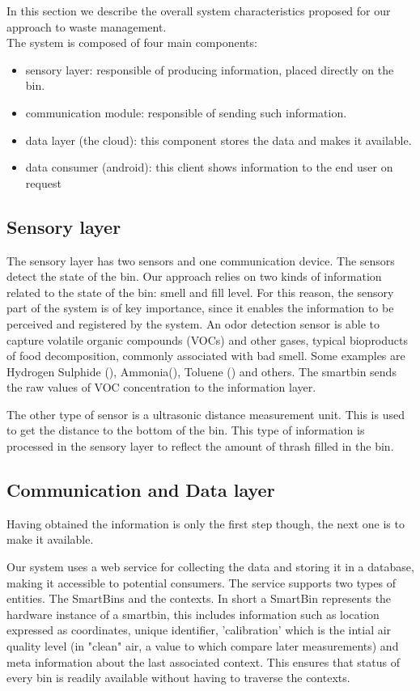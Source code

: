 
In this section we describe the overall system characteristics proposed for our approach to waste management.\\

The system is composed of four main components:
\begin{itemize}
\item sensory layer: responsible of producing information, placed directly on the bin.
\item communication module: responsible of sending such information.
\item data layer (the cloud): this component stores the data and makes it available.
\item data consumer (android):  this client shows information to the end user on request
\end{itemize}

\subsection{Sensory layer}
The sensory layer has two sensors and one communication device. The sensors detect the state of the bin.
Our approach relies on two kinds of information related to the state of the bin: smell and fill level.
For this reason, the sensory part of the system is of key importance, since it enables the information to be perceived and registered by the system.
An odor detection sensor is able to capture volatile organic compounds (VOCs) and other gases, typical bioproducts of food decomposition, commonly associated with bad smell. 
Some examples are Hydrogen Sulphide (), Ammonia(), Toluene () and others.
The smartbin sends the raw values of VOC concentration to the information layer.

The other type of sensor is a ultrasonic distance measurement unit. This is used to get the distance to the bottom of the bin.
This type of information is processed in the sensory layer to reflect the amount of thrash filled in the bin.

\subsection{Communication and Data layer}
Having obtained the information is only the first step though, the next one is to make it available.

Our system uses a web service for collecting the data and storing it in a database, making it accessible to potential consumers.
The service supports two types of entities. The SmartBins and the contexts.
In short a SmartBin represents the hardware instance of a smartbin, this includes information such as location expressed as coordinates, unique identifier, 'calibration' which is the intial air quality level (in "clean" air, a value to which compare later measurements) and meta information about the last associated context.
This ensures that status of every bin is readily available without having to traverse the contexts.

